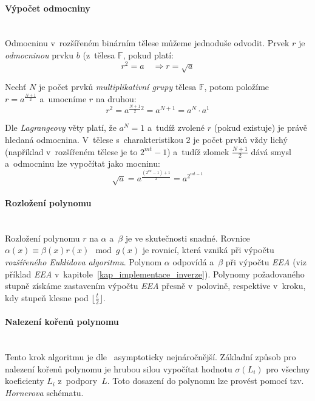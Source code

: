 \documentclass[thesis=M,czech,hidelinks]{FITthesis}[2012/06/26]
\newcommand{\0}{{\textcolor[gray]{0.75}{0}}}
\begin{document}
\paragraph{Výpočet odmocniny} \hfil \\
Odmocninu v~rozšířeném binárním tělese můžeme jednoduše odvodit. Prvek $r$ je
\emph{odmocninou} prvku $b$ (z~tělesa $\mathbb{F}$, pokud platí:
$$ r^2 = a \quad \Rightarrow r = \sqrt{a} $$

Nechť $N$ je počet prvků \emph{multiplikativní grupy} tělesa $\mathbb{F}$, potom
položíme \\
$r = a^{\frac{N+1}{2}} $ a~umocníme $r$ na druhou:
$$ r^2 = a^{\frac{N+1}{2} 2} = a^{N+1} = a^N \cdot a^1 $$

Dle \emph{Lagrangeovy} věty platí, že $a^N = 1 $ a~tudíž zvolené $r$ (pokud
existuje) je právě hledaná odmocnina. V~tělese s~charakteristikou $2$ je počet
prvků vždy lichý (například v~rozšířeném tělese je to $2^{mt}-1$) a~tudíž zlomek
$\frac{N+1}{2}$ dává smysl a~odmocninu lze vypočítat jako mocninu:
$$ \sqrt{a} = a^{\frac{(2^{mt}-1) + 1}{2}} = a^{2^{mt - 1}} $$


\paragraph{Rozložení polynomu} \hfil \\
Rozložení polynomu $r$ na $\alpha$ a~$\beta$ je ve skutečnosti snadné. Rovnice
$\alpha(x) \equiv \beta(x) r(x) \mod g(x)$ je rovnicí, která vzniká při výpočtu
\emph{rozšířeného Euklidova algoritmu}. Polynom $\alpha$ odpovídá 
a~$\beta$  při výpočtu \emph{EEA} (viz příklad \emph{EEA}
v~kapitole~\ref{kap_implementace_inverze}). Polynomy požadovaného stupně získáme
zastavením výpočtu \emph{EEA} přesně v~polovině, respektive v~kroku, kdy
stupeň  klesne pod $\lfloor\frac{t}{2}\rfloor$.


\paragraph{Nalezení kořenů polynomu} \hfil \\
Tento krok algoritmu je dle~\cite{Engelbert} asymptoticky nejnáročnější.
Základní způsob pro nalezení kořenů polynomu je hrubou silou vypočítat hodnotu
$\sigma(L_i)$ pro všechny koeficienty $L_i$ z~podpory~$L$. Toto dosazení do
polynomu lze provést pomocí tzv. \emph{Hornerova} schématu.
\end{document}
